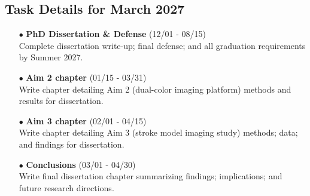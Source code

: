 \documentclass[landscape,a4paper]{article}
\begin{document}
\vspace{0.5cm}
\subsection{Task Details for March 2027}
\begin{itemize}[leftmargin=1cm]
    \item[\textcolor{other}{$\bullet$}] \textbf{PhD Dissertation \& Defense} (12/01 - 08/15)\\ Complete dissertation write-up; final defense; and all graduation requirements by Summer 2027.
    \item[\textcolor{other}{$\bullet$}] \textbf{Aim 2 chapter} (01/15 - 03/31)\\ Write chapter detailing Aim 2 (dual-color imaging platform) methods and results for dissertation.
    \item[\textcolor{other}{$\bullet$}] \textbf{Aim 3 chapter} (02/01 - 04/15)\\ Write chapter detailing Aim 3 (stroke model imaging study) methods; data; and findings for dissertation.
    \item[\textcolor{other}{$\bullet$}] \textbf{Conclusions} (03/01 - 04/30)\\ Write final dissertation chapter summarizing findings; implications; and future research directions.
\end{itemize}
\end{document}
